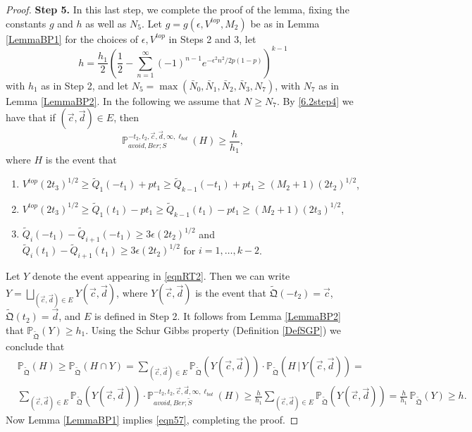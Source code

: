 \begin{proof}
	{\bf \raggedleft Step 5.} In this last step, we complete the proof of the lemma, fixing the constants $g$ and $h$ as well as $N_5$. Let $g=g(\epsilon,V^{top},M_2)$ be as in Lemma \ref{LemmaBP1} for the choices of $\epsilon,V^{top}$ in Steps 2 and 3, let
	\[
	h = \frac{h_1}{2}\left(\frac{1}{2} - \sum_{n=1}^\infty (-1)^{n-1} e^{-\epsilon^2 n^2/2p(1-p)}\right)^{k-1}
	\]
	with $h_1$ as in Step 2, and let $N_5 = \max(\bar{N}_0,\bar{N}_1,\bar{N}_2,\bar{N}_3,N_7)$, with $N_7$ as in Lemma \ref{LemmaBP2}. In the following we assume that $N\geq N_7$. By \eqref{6.2step4} we have that if $(\vec{c},\vec{d})\in E$, then
	$$\mathbb{P}_{avoid, Ber;S}^{-t_2, t_2, \vec{c}, \vec{d}, \infty, \ell_{bot}} ( H) \geq \frac{h}{h_1},$$
	where $H$ is the event that
	
	\begin{enumerate}
		\item $V^{top} (2t_3)^{1/2} \geq \tilde Q_1(-t_1) + p t_1 \geq \tilde Q_{k-1}(-t_1) + pt_1 \geq (M_2 + 1) (2t_2)^{1/2}$,
		\item $V^{top} (2t_3)^{1/2} \geq \tilde Q_1(t_1) - p t_1 \geq \tilde Q_{k-1}(t_1) - pt_1 \geq (M_2 + 1) (2t_3)^{1/2}$,
		\item $\tilde Q_i(-t_1) - \tilde Q_{i+1}(-t_1) \geq 3\epsilon (2t_2)^{1/2}$ and $\tilde Q_i(t_1) - \tilde Q_{i+1}(t_1)  \geq 3 \epsilon (2t_2)^{1/2}$ for $i = 1, \dots, k-2$.
	\end{enumerate}
	Let $Y$ denote the event appearing in \eqref{eqnRT2}. Then we can write $Y = \bigsqcup_{(\vec{c},\vec{d})\in E} Y(\vec{c},\vec{d})$, where $Y(\vec{c},\vec{d})$ is the event that $\tilde{\mathfrak{Q}}(-t_2) = \vec{c}$, $\tilde{\mathfrak{Q}}(t_2) = \vec{d}$, and $E$ is defined in Step 2. It follows from Lemma \ref{LemmaBP2} that $\mathbb{P}_{\tilde{\mathfrak Q}}(Y) \geq h_1$. Using the Schur Gibbs property (Definition \ref{DefSGP}) we conclude that
	\begin{align*}
	&\mathbb{P}_{\tilde{\mathfrak{Q}}}(H) \geq \mathbb{P}_{\tilde{\mathfrak{Q}}}(H\cap Y) = \sum_{(\vec{c},\vec{d})\in E} \mathbb{P}_{\tilde{\mathfrak{Q}}}(Y(\vec{c},\vec{d}))\cdot \mathbb{P}_{\tilde{\mathfrak{Q}}}(H\,|\,Y(\vec{c},\vec{d})) =\\
	&\sum_{(\vec{c},\vec{d})\in E} \mathbb{P}_{\tilde{\mathfrak{Q}}}(Y(\vec{c},\vec{d}))\cdot \mathbb{P}^{-t_2,t_2,\vec{c},\vec{d},\infty,\ell_{bot}}_{avoid,Ber;\tilde S}(H) \geq \frac{h}{h_1}\sum_{(\vec{c},\vec{d})\in E} \mathbb{P}_{\tilde{\mathfrak{Q}}}(Y(\vec{c},\vec{d})) = \frac{h}{h_1}\,\mathbb{P}_{\tilde{\mathfrak{Q}}}(Y) \geq h.
	\end{align*}
	Now Lemma \ref{LemmaBP1} implies \eqref{eqn57}, completing the proof.
\end{proof}